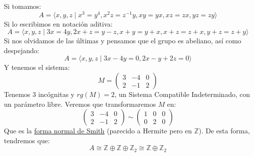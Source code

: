 \begin{ejemplo}
    Si tomamos:
    \begin{equation*}
        A = \langle x,y,z \mid x^3=y^4, x^2z = z^{-1}y, xy=yx, xz=zx, yz=zy \rangle 
    \end{equation*}
    Si lo escribimos en notación aditiva:
    \begin{equation*}
        A = \langle x,y,z \mid 3x=4y, 2x+z = y-z, x+y=y+x, x+z = z+x, y+z=z+y\rangle 
    \end{equation*}
    Si nos olvidamos de las últimas y pensamos que el grupo es abeliano, así como despejando:
    \begin{equation*}
        A = \langle x,y,z \mid 3x-4y = 0, 2x-y+2z = 0 \rangle 
    \end{equation*}
    Y tenemos el sistema:
    \begin{equation*}
        M = \left(\begin{array}{ccc}
            3 & -4 & 0 \\
            2 & -1 & 2
        \end{array}\right)
    \end{equation*}
    Tenemos 3 incógnitas y $rg(M) = 2$, un Sistema Compatible Indeterminado, con un parámetro libre. Veremos que transformaremos $M$ en:
    \begin{equation*}
        \left(\begin{array}{ccc}
            3 & -4 & 0 \\
            2 & -1 & 2
        \end{array}\right) \sim \left(\begin{array}{ccc}
            1 & 0 & 0 \\
            0 & 2 & 0
        \end{array}\right)
    \end{equation*}
    Que es la \underline{forma normal de Smith} (parecido a Hermite pero en $\mathbb{Z}$). De esta forma, tendremos que:
    \begin{equation*}
        A\cong \mathbb{Z} \oplus \mathbb{Z} \oplus \mathbb{Z}_2 \cong \mathbb{Z} \oplus \mathbb{Z}_2
    \end{equation*} %
\end{ejemplo}
